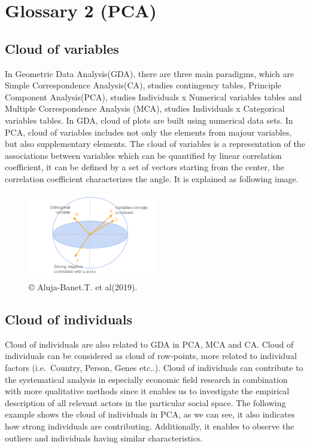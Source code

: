 \documentclass[]{book}
\begin{document}
\hypertarget{glossary-2-pca}{%
\chapter{Glossary 2 (PCA)}\label{glossary-2-pca}}

\hypertarget{cloud-of-variables}{%
\section{Cloud of variables}\label{cloud-of-variables}}

In Geometric Data Analysis(GDA), there are three main paradigms, which are Simple Correspondence Analysis(CA), studies contingency tables, Principle Component Analysis(PCA), studies Individuals x Numerical variables tables and Multiple Correspondence Analysis (MCA), studies Individuals x Categorical variables tables.
In GDA, cloud of plots are built using numerical data sets. In PCA, cloud of variables includes not only the elements from majour variables, but also supplementary elements.
The cloud of variables is a representation of the associations between variables which can be quantified by linear correlation coefficient, it can be defined by a set of vectors starting from the center, the correlation coefficient characterizes the angle.
It is explained as following image.

\begin{figure}
\centering
\includegraphics[width=0.5\textwidth,height=\textheight]{Figure_variable.png}
\caption{© Aluja-Banet.T. et al(2019).}
\end{figure}

\hypertarget{cloud-of-individuals}{%
\section{Cloud of individuals}\label{cloud-of-individuals}}

Cloud of individuals are also related to GDA in PCA, MCA and CA. Cloud of individuals can be considered as cloud of row-points, more related to individual factors (i.e.~Country, Person, Genes etc..).
Cloud of individuals can contribute to the systematical analysis in especially economic field research in combination with more qualitative methods since it enables us to investigate the empirical description of all relevant actors in the particular social space.
The following example shows the cloud of individuals in PCA, as we can see, it also indicates how strong individuals are contributing. Additionally, it enables to observe the outliers and individuals having similar characteristics.
\end{document}
